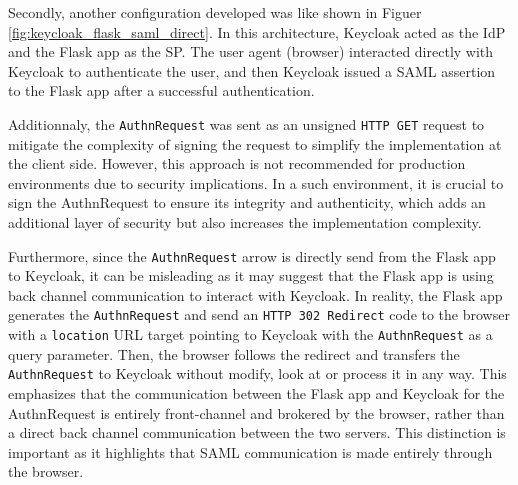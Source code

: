 \documentclass[../memoire.tex]{subfiles}
\begin{document}
Secondly, another configuration developed was like shown in Figuer \ref{fig:keycloak_flask_saml_direct}. In this architecture, Keycloak acted as the IdP and the Flask app as the SP. The user agent (browser) interacted directly with Keycloak to authenticate the user, and then Keycloak issued a SAML assertion to the Flask app after a successful authentication. 


Additionnaly, the \texttt{AuthnRequest} was sent as an unsigned \texttt{HTTP GET} request to mitigate the complexity of signing the request to simplify the implementation at the client side. However, this approach is not recommended for production environments due to security implications. In a such environment, it is crucial to sign the AuthnRequest to ensure its integrity and authenticity, which adds an additional layer of security but also increases the implementation complexity.

Furthermore, since the \texttt{AuthnRequest} arrow is directly send from the Flask app to Keycloak, it can be misleading as it may suggest that the Flask app is using back channel communication to interact with Keycloak. In reality, the Flask app generates the \texttt{AuthnRequest} and send an \texttt{HTTP 302 Redirect} code to the browser with a \texttt{location} URL target pointing to Keycloak with the \texttt{AuthnRequest} as a query parameter. Then, the browser follows the redirect and transfers the \texttt{AuthnRequest} to Keycloak without modify, look at or process it in any way. This emphasizes that the communication between the Flask app and Keycloak for the AuthnRequest is entirely front-channel and brokered by the browser, rather than a direct back channel communication between the two servers. This distinction is important as it highlights that SAML communication is made entirely through the browser.
\end{document}
